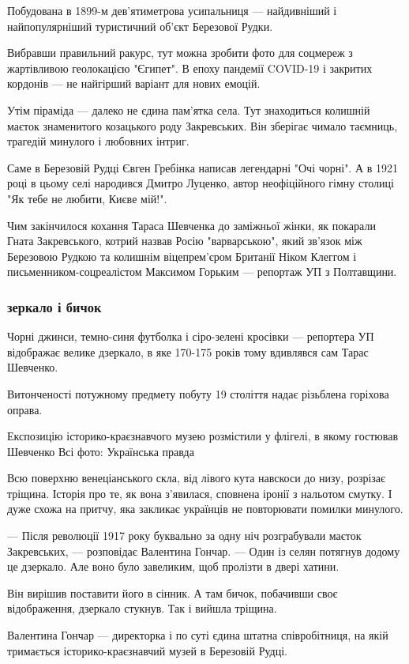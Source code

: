 \documentclass[a4paper,11pt]{extreport}
\begin{document}
Побудована в 1899-м дев'ятиметрова усипальниця --- найдивніший і найпопулярніший
туристичний об'єкт Березової Рудки.

Вибравши правильний ракурс, тут можна зробити фото для соцмереж з жартівливою
геолокацією "Єгипет". В епоху пандемії COVID-19 і закритих кордонів --- не
найгірший варіант для нових емоцій.

Утім піраміда --- далеко не єдина пам'ятка села. Тут знаходиться колишній маєток
знаменитого козацького роду Закревських. Він зберігає чимало таємниць, трагедій
минулого і любовних інтриг.

Саме в Березовій Рудці Євген Гребінка написав легендарні "Очі чорні". А в 1921
році в цьому селі народився Дмитро Луценко, автор неофіційного гімну столиці
"Як тебе не любити, Києве мій!".

Чим закінчилося кохання Тараса Шевченка до заміжньої жінки, як покарали Гната
Закревського, котрий назвав Росію "варварською", який зв'язок між Березовою
Рудкою та колишнім віцепрем'єром Британії Ніком Клеггом і
письменником-соцреалістом Максимом Горьким --- репортаж УП з Полтавщини.

\subsubsection{зеркало і бичок}

Чорні джинси, темно-синя футболка і сіро-зелені кросівки --- репортера УП
відображає велике дзеркало, в яке 170-175 років тому вдивлявся сам Тарас
Шевченко.

Витонченості потужному предмету побуту 19 століття надає різьблена горіхова
оправа.

Експозицію історико-краєзнавчого музею розмістили у флігелі, в якому гостював
Шевченко Всі фото: Українська правда

Всю поверхню венеціанського скла, від лівого кута навскоси до низу, розрізає
тріщина. Історія про те, як вона з'явилася, сповнена іронії з нальотом смутку.
І дуже схожа на притчу, яка закликає українців не повторювати помилки минулого.

--- Після революції 1917 року буквально за одну ніч розграбували маєток
Закревських, --- розповідає Валентина Гончар. --- Один із селян потягнув додому це
дзеркало. Але воно було завеликим, щоб пролізти в двері хатини.

Він вирішив поставити його в сінник. А там бичок, побачивши своє відображення,
дзеркало стукнув. Так і вийшла тріщина.

Валентина Гончар --- директорка і по суті єдина штатна співробітниця, на якій
тримається історико-краєзнавчий музей в Березовій Рудці. 
\end{document}
